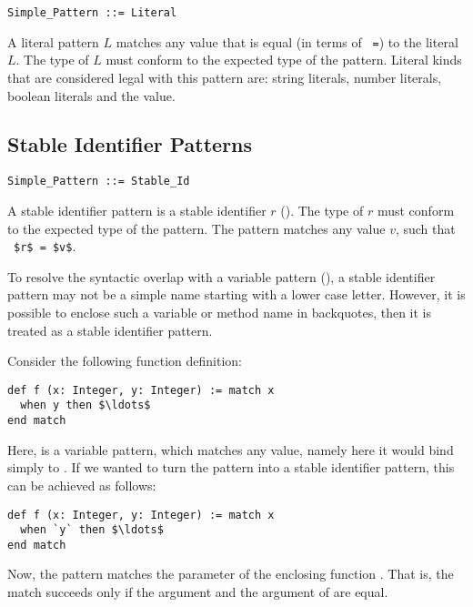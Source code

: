 \syntax\begin{lstlisting}
Simple_Pattern ::= Literal
\end{lstlisting}

A literal pattern $L$ matches any value that is equal (in terms of ~\lstinline!=!) to the literal $L$. The type of $L$ must conform to the expected type of the pattern. Literal kinds that are considered legal with this pattern are: string literals, number literals, boolean literals and the  value. 





\subsection{Stable Identifier Patterns}
\label{sec:stable-identifier-patterns}

\syntax\begin{lstlisting}
Simple_Pattern ::= Stable_Id
\end{lstlisting}

A stable identifier pattern is a stable identifier $r$ (). The type of $r$ must conform to the expected type of the pattern. The pattern matches any value $v$, such that ~\lstinline!$r$ = $v$!.

To resolve the syntactic overlap with a variable pattern (), a stable identifier pattern may not be a simple name starting with a lower case letter. However, it is possible to enclose such a variable or method name in backquotes, then it is treated as a stable identifier pattern. 

\example Consider the following function definition:
\begin{lstlisting}
def f (x: Integer, y: Integer) := match x
  when y then $\ldots$
end match
\end{lstlisting}
Here,  is a variable pattern, which matches any value, namely here it would bind simply to . If we wanted to turn the pattern into a stable identifier pattern, this can be achieved as follows:
\begin{lstlisting}
def f (x: Integer, y: Integer) := match x
  when `y` then $\ldots$
end match
\end{lstlisting}
Now, the pattern matches the  parameter of the enclosing function . That is, the match succeeds only if the  argument and the  argument of  are equal. 






